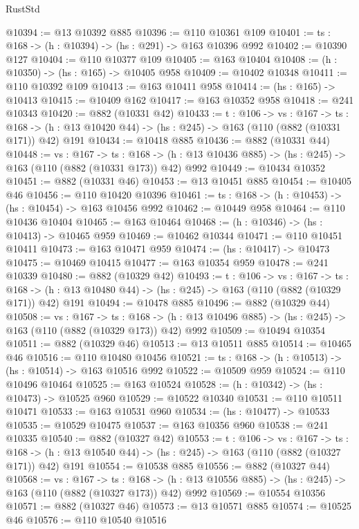 \begin{lexlean}{RustStd}
\begin{coremodule}
@10394 := @13 @10392 @885
@10396 := @110 @10361 @109
@10401 := {ts : @168} -> (h : @10394) -> (hs : @291) -> @163 @10396 @992
@10402 := @10390 @127
@10404 := @110 @10377 @109
@10405 := @163 @10404
@10408 := (h : @10350) -> (hs : @165) -> @10405 @958
@10409 := @10402 @10348
@10411 := @110 @10392 @109
@10413 := @163 @10411 @958
@10414 := (hs : @165) -> @10413
@10415 := @10409 @162
@10417 := @163 @10352 @958
@10418 := @241 @10343
@10420 := @882 (@10331 @42)
@10433 := {t : @106} ->
  {vs : @167} ->
  {ts : @168} -> (h : @13 @10420 @44) -> (hs : @245) -> @163 (@110 (@882 (@10331 @171)) @42) @191
@10434 := @10418 @885
@10436 := @882 (@10331 @44)
@10448 := {vs : @167} ->
  {ts : @168} -> (h : @13 @10436 @885) -> (hs : @245) -> @163 (@110 (@882 (@10331 @173)) @42) @992
@10449 := @10434 @10352
@10451 := @882 (@10331 @46)
@10453 := @13 @10451 @885
@10454 := @10405 @46
@10456 := @110 @10420 @10396
@10461 := {ts : @168} -> (h : @10453) -> (hs : @10454) -> @163 @10456 @992
@10462 := @10449 @958
@10464 := @110 @10436 @10404
@10465 := @163 @10464
@10468 := (h : @10346) -> (hs : @10413) -> @10465 @959
@10469 := @10462 @10344
@10471 := @110 @10451 @10411
@10473 := @163 @10471 @959
@10474 := (hs : @10417) -> @10473
@10475 := @10469 @10415
@10477 := @163 @10354 @959
@10478 := @241 @10339
@10480 := @882 (@10329 @42)
@10493 := {t : @106} ->
  {vs : @167} ->
  {ts : @168} -> (h : @13 @10480 @44) -> (hs : @245) -> @163 (@110 (@882 (@10329 @171)) @42) @191
@10494 := @10478 @885
@10496 := @882 (@10329 @44)
@10508 := {vs : @167} ->
  {ts : @168} -> (h : @13 @10496 @885) -> (hs : @245) -> @163 (@110 (@882 (@10329 @173)) @42) @992
@10509 := @10494 @10354
@10511 := @882 (@10329 @46)
@10513 := @13 @10511 @885
@10514 := @10465 @46
@10516 := @110 @10480 @10456
@10521 := {ts : @168} -> (h : @10513) -> (hs : @10514) -> @163 @10516 @992
@10522 := @10509 @959
@10524 := @110 @10496 @10464
@10525 := @163 @10524
@10528 := (h : @10342) -> (hs : @10473) -> @10525 @960
@10529 := @10522 @10340
@10531 := @110 @10511 @10471
@10533 := @163 @10531 @960
@10534 := (hs : @10477) -> @10533
@10535 := @10529 @10475
@10537 := @163 @10356 @960
@10538 := @241 @10335
@10540 := @882 (@10327 @42)
@10553 := {t : @106} ->
  {vs : @167} ->
  {ts : @168} -> (h : @13 @10540 @44) -> (hs : @245) -> @163 (@110 (@882 (@10327 @171)) @42) @191
@10554 := @10538 @885
@10556 := @882 (@10327 @44)
@10568 := {vs : @167} ->
  {ts : @168} -> (h : @13 @10556 @885) -> (hs : @245) -> @163 (@110 (@882 (@10327 @173)) @42) @992
@10569 := @10554 @10356
@10571 := @882 (@10327 @46)
@10573 := @13 @10571 @885
@10574 := @10525 @46
@10576 := @110 @10540 @10516

\end{coremodule}
\end{lexlean}
